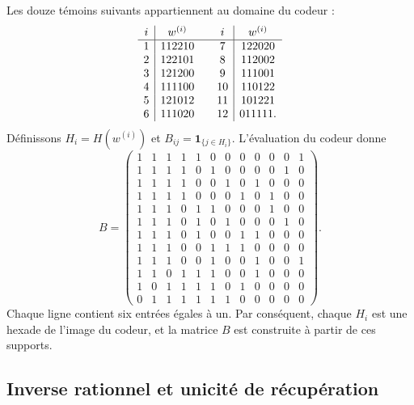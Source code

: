 Les douze témoins suivants appartiennent au domaine du codeur :
\[
\begin{array}{c|c@{\qquad}c|c}
i&w^{(i)}&i&w^{(i)}\\\hline
1&112210&7&122020\\
2&122101&8&112002\\
3&121200&9&111001\\
4&111100&10&110122\\
5&121012&11&101221\\
6&111020&12&011111.
\end{array}
\]
Définissons $H_i=H(w^{(i)})$ et
$B_{ij}=\mathbf1_{\{j\in H_i\}}$. L'évaluation du codeur donne
\begingroup\small\setlength{\arraycolsep}{3pt}
\setcounter{MaxMatrixCols}{12}
\begin{equation}
B=\begin{pmatrix}
1&1&1&1&1&0&0&0&0&0&0&1\\
1&1&1&1&0&1&0&0&0&0&1&0\\
1&1&1&1&0&0&1&0&1&0&0&0\\
1&1&1&1&0&0&0&1&0&1&0&0\\
1&1&1&0&1&1&0&0&0&1&0&0\\
1&1&1&0&1&0&1&0&0&0&1&0\\
1&1&1&0&1&0&0&1&1&0&0&0\\
1&1&1&0&0&1&1&1&0&0&0&0\\
1&1&1&0&0&1&0&0&1&0&0&1\\
1&1&0&1&1&1&0&0&1&0&0&0\\
1&0&1&1&1&1&0&1&0&0&0&0\\
0&1&1&1&1&1&1&0&0&0&0&0
\end{pmatrix}.
\label{rh:eq:incidencia}
\end{equation}
\endgroup
Chaque ligne contient six entrées égales à un. Par conséquent, chaque
$H_i$ est une hexade de l'image du codeur, et la matrice $B$ est
construite à partir de ces supports.

\subsection{Inverse rationnel et unicité de récupération}

